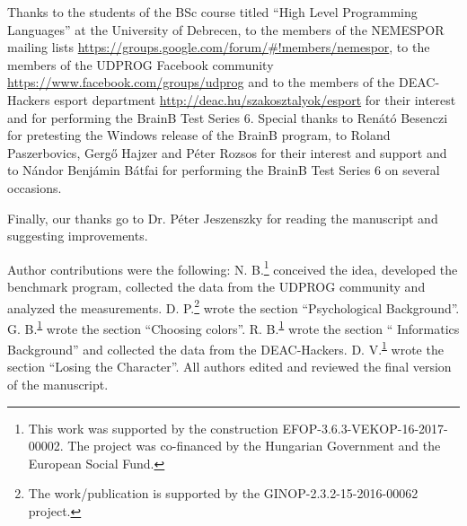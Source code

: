 Thanks to 
the students of the BSc course titled “High Level Programming Languages” at the University of Debrecen, 
to the members of the NEMESPOR mailing lists \url{https://groups.google.com/forum/#!members/nemespor}, 
to the members of the UDPROG Facebook community \url{https://www.facebook.com/groups/udprog}
and to the members of the DEAC-Hackers esport department \url{http://deac.hu/szakosztalyok/esport}
for their interest and for performing the BrainB Test Series 6.
Special thanks 
to Ren\'at\'o Besenczi for pretesting the Windows release of the BrainB program,
to Roland Paszerbovics, Gerg\H o Hajzer and P\'eter Rozsos for their interest and support
and to N\'andor Benj\'amin B\'atfai for performing the BrainB Test Series 6 on several occasions.

Finally, our thanks go to Dr. P\'eter Jeszenszky for reading the manuscript and suggesting improvements.

Author contributions were the following: 
N. B.\footnote{\label{efop363}This work was supported by the construction EFOP-3.6.3-VEKOP-16-2017-00002. The project was co-financed by the Hungarian Government and the European Social Fund.} 
conceived the idea, developed the benchmark program, collected the data from the UDPROG community and analyzed the measurements. 
D. P.\footnote{The work/publication is supported by the GINOP-2.3.2-15-2016-00062 project.} 
wrote the section \enquote{Psychological Background}. 
G. B.\textsuperscript{\ref{efop363}} wrote the section \enquote{Choosing colors}. 
R. B.\textsuperscript{\ref{efop363}} wrote the section \enquote{ Informatics Background} and collected the data from the DEAC-Hackers.
D. V.\textsuperscript{\ref{efop363}} wrote the  section \enquote{Losing the Character}.
All authors edited and reviewed the final version of the manuscript.

